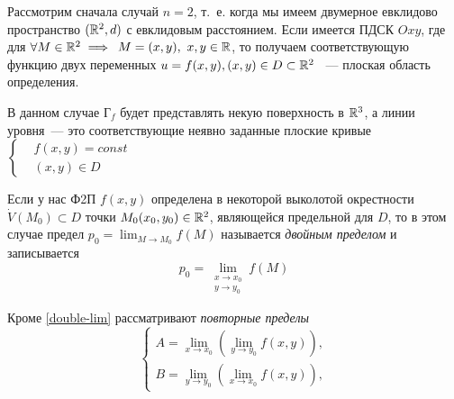 \documentclass[../../main.tex]{subfiles}
\begin{document}
Рассмотрим сначала случай $n=2$, т.~е. когда мы имеем двумерное евклидово
пространство $(\mathbb{R}^2, d)$ с евклидовым расстоянием. Если 
имеется ПДСК $Oxy$, где для
$\forall M \in \mathbb{R}^2 \implies$
$M = (x, y),\ x, y \in \mathbb{R}$, то получаем
соответствующую функцию двух переменных 
$u = f(x, y), (x, y) \in D \subset \mathbb{R}^2$ ~---
плоская область определения.

В данном случае $\text{Г}_f$ будет представлять некую поверхность в $\mathbb{R}^3$,
а линии уровня~--- это соответствующие неявно заданные плоские кривые
$\left\{\begin{aligned}
	&f(x, y) = const \\
	&(x, y) \in D
\end{aligned}\right.$

Если у нас Ф2П $f(x, y)$ определена в некоторой выколотой окрестности 
$\dot{V}(M_0) \subset D$ точки $M_0(x_0, y_0) \in \mathbb{R}^2$,
являющейся предельной для $D$, то в этом случае  предел
$p_0 = \displaystyle \lim_{M \to M_0}{f(M)}$ называется
\emph{двойным пределом} и записывается 
\begin{equation}
\label{double-lim}
p_0 = \underset{\substack{
	x \to x_0 \\
	y \to y_0
}}{\lim}f(M)
\end{equation}

Кроме \eqref{double-lim} рассматривают \emph{повторные пределы}
\begin{equation}
\label{rep-lim}
	\left\{\begin{aligned}
		A = \displaystyle\lim_{x \to x_0}{(\lim_{y \to y_0}{f(x, y)})}, \\
		B = \displaystyle\lim_{y \to y_0}{(\lim_{x \to x_0}{f(x, y)})}, 
	\end{aligned}\right.
\end{equation}
\end{document}

